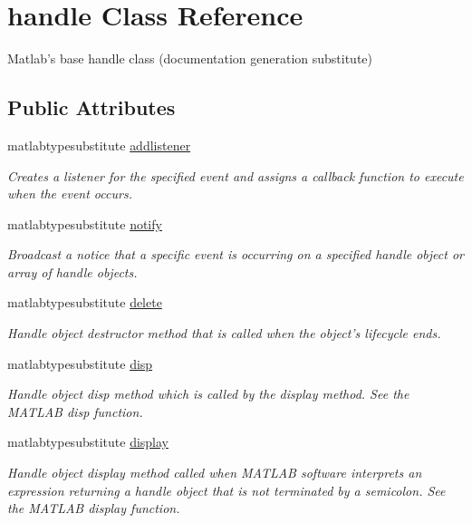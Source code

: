 \hypertarget{classhandle}{\section{handle Class Reference}
\label{classhandle}
}


Matlab's base handle class (documentation generation substitute)  


\subsection*{Public Attributes}
\begin{DoxyCompactItemize}
\item 
matlabtypesubstitute \hyperlink{classhandle_aa72d46799b8792edbf8acb7349680c15}{addlistener}
\begin{DoxyCompactList}\small\item\em Creates a listener for the specified event and assigns a callback function to execute when the event occurs. \end{DoxyCompactList}\item 
matlabtypesubstitute \hyperlink{classhandle_a8cfc3dab9d3ecc55b0b3449c2c7afd6f}{notify}
\begin{DoxyCompactList}\small\item\em Broadcast a notice that a specific event is occurring on a specified handle object or array of handle objects. \end{DoxyCompactList}\item 
matlabtypesubstitute \hyperlink{classhandle_a1d55d41c7af285b8fe7ab17ed5e176f6}{delete}
\begin{DoxyCompactList}\small\item\em Handle object destructor method that is called when the object's lifecycle ends. \end{DoxyCompactList}\item 
matlabtypesubstitute \hyperlink{classhandle_adedb524cfbdf6a5d946cc57ef6745099}{disp}
\begin{DoxyCompactList}\small\item\em Handle object disp method which is called by the display method. See the M\-A\-T\-L\-A\-B disp function. \end{DoxyCompactList}\item 
matlabtypesubstitute \hyperlink{classhandle_a2e26be32e99b2b98db18bb538638b814}{display}
\begin{DoxyCompactList}\small\item\em Handle object display method called when M\-A\-T\-L\-A\-B software interprets an expression returning a handle object that is not terminated by a semicolon. See the M\-A\-T\-L\-A\-B display function. \end{DoxyCompactList}\item 

\end{DoxyCompactItemize}
